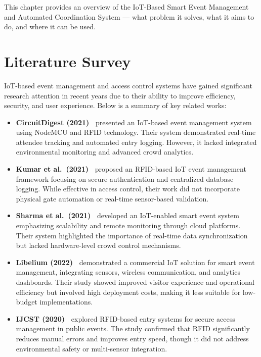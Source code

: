 \documentclass[12pt,a4paper]{report}
\begin{document}
This chapter provides an overview of the IoT-Based Smart Event Management and Automated Coordination System --- what problem it solves, what it aims to do, and where it can be used.

\section{Literature Survey}

IoT-based event management and access control systems have gained significant research attention in recent years due to their ability to improve efficiency, security, and user experience. Below is a summary of key related works:

\begin{itemize}[leftmargin=*]

\item \textbf{CircuitDigest (2021)~\cite{circuitdigest2021}} presented an IoT-based event management system using NodeMCU and RFID technology. Their system demonstrated real-time attendee tracking and automated entry logging. However, it lacked integrated environmental monitoring and advanced crowd analytics.

\item \textbf{Kumar et al.\ (2021)~\cite{kumar2021}} proposed an RFID-based IoT event management framework focusing on secure authentication and centralized database logging. While effective in access control, their work did not incorporate physical gate automation or real-time sensor-based validation.

\item \textbf{Sharma et al.\ (2021)~\cite{sharma2021}} developed an IoT-enabled smart event system emphasizing scalability and remote monitoring through cloud platforms. Their system highlighted the importance of real-time data synchronization but lacked hardware-level crowd control mechanisms.

\item \textbf{Libelium (2022)~\cite{libelium2022}} demonstrated a commercial IoT solution for smart event management, integrating sensors, wireless communication, and analytics dashboards. Their study showed improved visitor experience and operational efficiency but involved high deployment costs, making it less suitable for low-budget implementations.

\item \textbf{IJCST (2020)~\cite{ijcst2020}} explored RFID-based entry systems for secure access management in public events. The study confirmed that RFID significantly reduces manual errors and improves entry speed, though it did not address environmental safety or multi-sensor integration.

\end{itemize}
\end{document}
